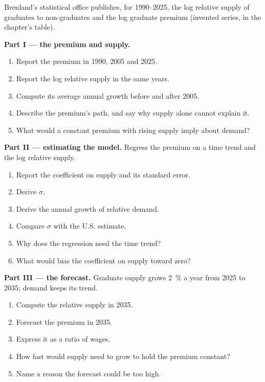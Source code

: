 \begin{problem}\label{pb:b3:wage-structure:graduates}
Brenland's statistical office publishes, for 1990--2025, the log relative supply of
graduates to non-graduates and the log graduate premium (invented series, in the
chapter's  table). %

\medskip\noindent\textbf{Part I --- the premium and supply.}
\begin{enumerate}
\item Report the premium in 1990, 2005 and 2025.
\item Report the log relative supply in the same years.
\item Compute its average annual growth before and after 2005.
\item Describe the premium's path, and say why supply alone cannot explain it.
\item What would a constant premium with rising supply imply about demand?
\end{enumerate}

\medskip\noindent\textbf{Part II --- estimating the model.} Regress the premium on a
time trend and the log relative supply.
\begin{enumerate}[resume]
\item Report the coefficient on supply and its standard error.
\item Derive $\sigma$.
\item Derive the annual growth of relative demand.
\item Compare $\sigma$ with the U.S. estimate.
\item Why does the regression need the time trend?
\item What would bias the coefficient on supply toward zero?
\end{enumerate}

\medskip\noindent\textbf{Part III --- the forecast.} Graduate supply grows 2~\% a year
from 2025 to 2035; demand keeps its trend.
\begin{enumerate}[resume]
\item Compute the relative supply in 2035.
\item Forecast the premium in 2035.
\item Express it as a ratio of wages.
\item How fast would supply need to grow to hold the premium constant?
\item Name a reason the forecast could be too high.
\end{enumerate}


\end{problem}
